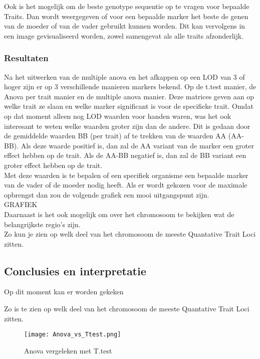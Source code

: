 \documentclass[12pt,a4paper]{article}
\begin{document}
Ook is het mogelijk om de beste genotype sequentie op te vragen voor bepaalde Traits.
Dan wordt weergegeven of voor een bepaalde marker het beste de genen van de moeder of van de vader gebruikt kunnen worden.
Dit kan vervolgens  in een image gevisualiseerd worden, zowel samengevat als alle traits afzonderlijk.


\subsubsection*{Resultaten}
Na het uitwerken van de multiple anova en het afkappen op een LOD van 3 of hoger zijn er op 3 verschillende manieren markers bekend. 
Op de t.test manier, de Anova per trait manier en de multiple anova manier. 
Deze matrices geven aan op welke trait ze slaan en welke marker significant is voor de specifieke trait.
Omdat  op dat moment alleen nog LOD waarden voor handen waren, was het ook interesant te weten welke waarden groter zijn dan de andere. 
Dit is gedaan door de gemiddelde waarden BB (per trait) af te trekken van de waarden AA (AA-BB).
Als deze waarde positief is, dan zal de AA variant van de marker een groter effect hebben op de trait. 
Als de AA-BB negatief is, dan zal de BB variant een groter effect hebben op de trait. \\
Met deze waarden is te bepalen of een specifiek organisme een bepaalde marker van de vader of de moeder nodig heeft.
Als er wordt gekozen voor de maximale opbrengst dan zou de volgende grafiek een mooi uitgangspunt zijn.\\
GRAFIEK\\
Daarnaast is het ook mogelijk om over het chromosoom te bekijken wat de belangrijkste regio's zijn.\\
Zo kun je zien op welk deel van het chromosoom de meeste Quantative Trait Loci zitten.
\subsection*{Conclusies en interpretatie}
Op dit moment kan er worden gekeken 




Zo is te zien op welk deel van het chromosoom de meeste Quantative Trait Loci zitten.
\pagebreak

\listoffigures
\pagebreak

\begin{figure}
\vspace{-6cm}
\hspace{-1.5cm}
\texttt{[image: Anova\_vs\_Ttest.png]}
\caption{Anova vergeleken met T.test}
\FloatBarrier
\end{figure}
\end{document}
